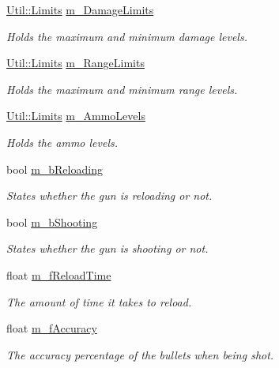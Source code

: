 \begin{DoxyCompactItemize}
\hyperlink{struct_util_1_1_limits}{Util\+::\+Limits} \hyperlink{class_weapon_a1500e8f7db28c7961867869ab493d3fb}{m\+\_\+\+Damage\+Limits}
\begin{DoxyCompactList}\small\item\em Holds the maximum and minimum damage levels. \end{DoxyCompactList}\item 
\hyperlink{struct_util_1_1_limits}{Util\+::\+Limits} \hyperlink{class_weapon_add73ac1e48373c7ffffa3bd3d48cf3f8}{m\+\_\+\+Range\+Limits}
\begin{DoxyCompactList}\small\item\em Holds the maximum and minimum range levels. \end{DoxyCompactList}\item 
\hyperlink{struct_util_1_1_limits}{Util\+::\+Limits} \hyperlink{class_weapon_a2bd22a1933d8b6055ea40677ee644bc4}{m\+\_\+\+Ammo\+Levels}
\begin{DoxyCompactList}\small\item\em Holds the ammo levels. \end{DoxyCompactList}\item 
bool \hyperlink{class_weapon_a3a62de7cbf3a4678c466ef79cec2c3d2}{m\+\_\+b\+Reloading}
\begin{DoxyCompactList}\small\item\em States whether the gun is reloading or not. \end{DoxyCompactList}\item 
bool \hyperlink{class_weapon_a398b8f70714c5e354ccc6a95d9372b51}{m\+\_\+b\+Shooting}
\begin{DoxyCompactList}\small\item\em States whether the gun is shooting or not. \end{DoxyCompactList}\item 
float \hyperlink{class_weapon_ade417935ef64756d69ee3daf0870b61b}{m\+\_\+f\+Reload\+Time}
\begin{DoxyCompactList}\small\item\em The amount of time it takes to reload. \end{DoxyCompactList}\item 
float \hyperlink{class_weapon_a020939ca7065b124871ecf4e8b9203a1}{m\+\_\+f\+Accuracy}
\begin{DoxyCompactList}\small\item\em The accuracy percentage of the bullets when being shot. \end{DoxyCompactList}\item 

\end{DoxyCompactItemize}
